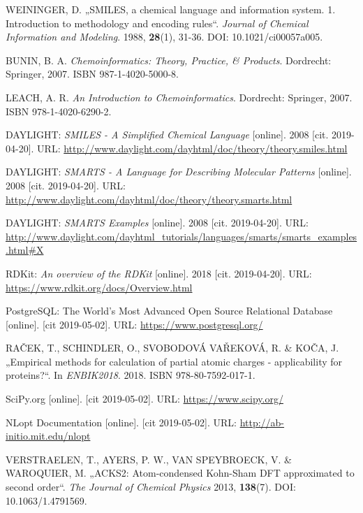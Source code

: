 \begin{thebibliography}{10}
WEININGER, D. „SMILES, a chemical language and information system. 1. Introduction to methodology and encoding rules“. \textit{Journal of Chemical Information and Modeling}. 1988, \textbf{28}(1), 31-36. DOI: 10.1021/ci00057a005.

BUNIN, B. A. \textit{Chemoinformatics: Theory, Practice, \& Products}. Dordrecht: Springer, 2007. ISBN 987-1-4020-5000-8.

LEACH, A. R. \textit{An Introduction to Chemoinformatics}. Dordrecht: Springer, 2007. ISBN 978-1-4020-6290-2.

DAYLIGHT: \textit{SMILES - A Simplified Chemical Language} [online]. 2008 [cit. 2019-04-20]. URL: \url{ http://www.daylight.com/dayhtml/doc/theory/theory.smiles.html}

DAYLIGHT: \textit{SMARTS - A Language for Describing Molecular Patterns} [online]. 2008 [cit. 2019-04-20]. URL: \url{ http://www.daylight.com/dayhtml/doc/theory/theory.smarts.html}

DAYLIGHT: \textit{SMARTS Examples} [online]. 2008 [cit. 2019-04-20]. URL: \url{ http://www.daylight.com/dayhtml_tutorials/languages/smarts/smarts_examples.html#X}

RDKit: \textit{An overview of the RDKit} [online]. 2018 [cit. 2019-04-20]. URL: \url{ https://www.rdkit.org/docs/Overview.html}

PostgreSQL: The World's Most Advanced Open Source Relational Database [online]. [cit 2019-05-02]. URL: \url{https://www.postgresql.org/}

RAČEK, T., SCHINDLER, O., SVOBODOVÁ VAŘEKOVÁ, R. \& KOČA, J. „Empirical methods for calculation of partial atomic charges - applicability for proteins?“. In \textit{ENBIK2018}. 2018. ISBN 978-80-7592-017-1.

SciPy.org [online]. [cit 2019-05-02]. URL: \url{https://www.scipy.org/}

NLopt Documentation [online]. [cit 2019-05-02].
URL: \url{http://ab-initio.mit.edu/nlopt}

VERSTRAELEN, T., AYERS, P. W., VAN SPEYBROECK, V. \& WAROQUIER, M. „ACKS2: Atom-condensed Kohn-Sham DFT approximated to second order“. \textit{The Journal of Chemical Physics} 2013, \textbf{138}(7). DOI: 10.1063/1.4791569.


\end{thebibliography}
